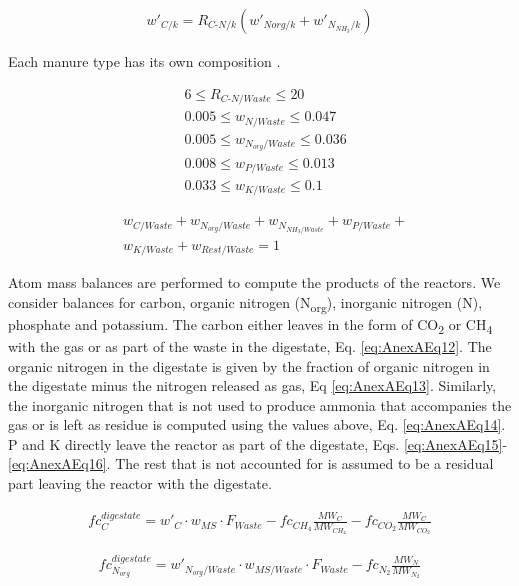 \begin{refsection}[referencesCh2]
\begin{align}
	w'_{C/k} = R_{C\text{-}N/k} \left( {w'_{Norg/k}} + w'_{N_{NH_{3}}/k} \right) \label{eq:AnexAEq9}
\end{align}

Each manure type has its own composition \citep{DEFRA}.

\begin{align}
		& 6 \le {R_{C\text{-}N/Waste}} \le 20 \nonumber \\
		& 0.005 \le w_{N/Waste} \le 0.047 \nonumber \\
		& 0.005 \le w_{N_{org}/Waste}  \label{eq:AnexAEq10} \le 0.036 \\
		& 0.008 \le w_{P/Waste} \le 0.013 \nonumber \\							
		& 0.033 \le w_{K/Waste}  \le  0.1 \nonumber
\end{align}

\begin{align}
	& {w}_{C/Waste} + {w}_{N_{org}/Waste} + {w}_{N_{NH_{3}/Waste}} + {w}_{P/Waste} + \label{eq:AnexAEq11} \\
	& {w}_{K/Waste} + {w}_{Rest/Waste} = 1 \nonumber
\end{align}

Atom mass balances are performed to compute the products of the reactors. We consider balances for carbon, organic nitrogen (N\textsubscript{org}), inorganic nitrogen (N), phosphate and potassium. The carbon either leaves in the form of CO\textsubscript{2} or CH\textsubscript{4} with the gas or as part of the waste in the digestate, Eq. \ref{eq:AnexAEq12}. The organic nitrogen in the digestate is given by the fraction of organic nitrogen in the digestate minus the nitrogen released as gas, Eq \ref{eq:AnexAEq13}. Similarly, the inorganic nitrogen that is not used to produce ammonia that accompanies the gas or is left as residue is computed using the values above, Eq. \ref{eq:AnexAEq14}. P and K directly leave the reactor as part of the digestate, Eqs. \ref{eq:AnexAEq15}-\ref{eq:AnexAEq16}. The rest that is not accounted for is assumed to be a residual part leaving the reactor with the digestate. 	

\begin{align}
	fc_C^{digestate} = w'_{C} \cdot w_{MS} \cdot F_{Waste} - fc_{CH_{4}} \frac{MW_{C}}{MW_{CH_{4}}} - fc _{CO_{2}} \frac{MW_{C}}{MW_{CO_{2}}} \label{eq:AnexAEq12}
\end{align}


\begin{align}
	fc_{N_{org}}^{digestate} = w'_{N_{org}/Waste} \cdot {w}_{MS/Waste} \cdot F_{Waste} - fc_{N_{2}} \frac{MW_{N}}{MW_{N_{2}}} \label{eq:AnexAEq13}
\end{align}



\end{refsection}
